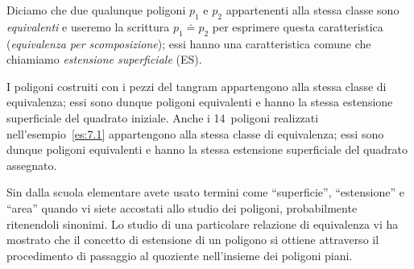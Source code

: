 % 
% 

\begin{definizione}
Diciamo che due qualunque poligoni $p_1$ e $p_2$ appartenenti alla 
stessa classe sono \emph{equivalenti} e useremo la scrittura 
$p_1\doteq p_2$ per esprimere questa caratteristica 
(\emph{equivalenza per scomposizione}); essi hanno una caratteristica 
comune che chiamiamo \emph{estensione superficiale} (ES).
\end{definizione}

I poligoni costruiti con i pezzi del tangram appartengono alla stessa 
classe di equivalenza; essi sono dunque poligoni equivalenti e hanno 
la stessa estensione superficiale del quadrato iniziale.
Anche i 14~poligoni realizzati nell'esempio~\ref{es:7.1} appartengono 
alla stessa classe di equivalenza; essi sono dunque poligoni 
equivalenti e hanno la stessa estensione superficiale del quadrato 
assegnato.

\osservazione Sin dalla scuola elementare avete usato termini come 
``superficie'', ``estensione'' e ``area'' quando vi siete accostati 
allo studio dei poligoni, probabilmente ritenendoli sinonimi. Lo 
studio di una particolare relazione di equivalenza vi ha mostrato che 
il concetto di estensione di un poligono si ottiene attraverso il 
procedimento di passaggio al quoziente nell'insieme dei poligoni 
piani.

